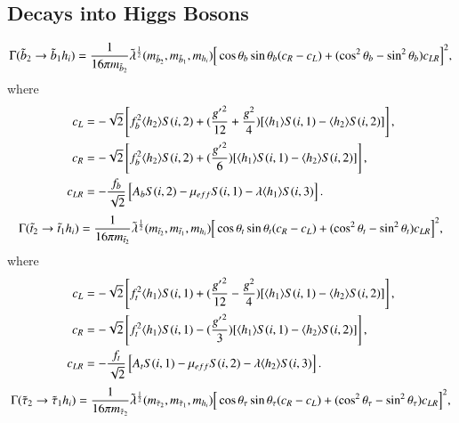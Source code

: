 \documentclass[final,3p,times,pdflatex]{elsarticle}
\begin{document}
\subsection{Decays into Higgs Bosons}
\begin{equation} \label{b2b1hNMSSM}
\Gamma(\tilde{b}_2 \rightarrow \tilde{b}_1 h_{i}) = {1 \over 16 \pi m_{\tilde{b}_2}}\tilde{\lambda}^{1 \over 2}(m_{\tilde{b}_2}, m_{\tilde{b}_1}, m_{h_i})\Big[\cos\theta_b \sin\theta_b (c_R - c_L) + (\cos^2 \theta_b - \sin^2 \theta_b) c_{LR}\Big]^2,
\end{equation}
where
\begin{align}
c_{L} &= -\sqrt{2}\left[f_{b}^2 \langle h_2 \rangle S(i,2) + ({{g'}^2 \over 12} + {g^2 \over 4})[\langle h_1 \rangle S(i,1) - \langle h_{2} \rangle S(i,2)]\right], \\
c_{R} &= -\sqrt{2}\left[f_{b}^2 \langle h_2 \rangle S(i,2) + ({{g'}^2 \over 6})[\langle h_1 \rangle S(i,1) - \langle h_{2} \rangle S(i,2)]\right], \\
c_{LR} &= -{f_{b} \over \sqrt{2}}\left[A_{b}S(i,2) - \mu_{eff}S(i,1)-\lambda \langle h_{1} \rangle S(i,3)\right].
\end{align}
\begin{equation} \label{t2t1hNMSSM}
\Gamma(\tilde{t}_2 \rightarrow \tilde{t}_1 h_{i}) = {1 \over 16 \pi m_{\tilde{t}_2}}\tilde{\lambda}^{1 \over 2}(m_{\tilde{t}_2}, m_{\tilde{t}_1}, m_{h_i})\Big[\cos\theta_t \sin\theta_t (c_R - c_L) + (\cos^2 \theta_t - \sin^2 \theta_t) c_{LR}\Big]^2,
\end{equation}
where
\begin{align}
c_{L} &= -\sqrt{2}\left[f_{t}^2 \langle h_1 \rangle S(i,1) + ({{g'}^2 \over 12} - {g^2 \over 4})[\langle h_1 \rangle S(i,1) - \langle h_{2} \rangle S(i,2)]\right], \\
c_{R} &= -\sqrt{2}\left[f_{t}^2 \langle h_1 \rangle S(i,1) - ({{g'}^2 \over 3})[\langle h_1 \rangle S(i,1) - \langle h_{2} \rangle S(i,2)]\right], \\
c_{LR} &= -{f_{t} \over \sqrt{2}}\left[A_{t}S(i,1) - \mu_{eff}S(i,2)-\lambda \langle h_{2} \rangle S(i,3)\right].
\end{align}
\begin{equation} \label{stau2stau1hNMSSM}
\Gamma(\tilde{\tau}_2 \rightarrow \tilde{\tau}_1 h_{i}) = {1 \over 16 \pi m_{\tilde{\tau}_2}}\tilde{\lambda}^{1 \over 2}(m_{\tilde{\tau}_2}, m_{\tilde{\tau}_1}, m_{h_i})\Big[\cos\theta_{\tau} \sin\theta_{\tau} (c_R - c_L) + (\cos^2 \theta_{\tau} - \sin^2 \theta_{\tau}) c_{LR}\Big]^2,
\end{equation}
\end{document}
